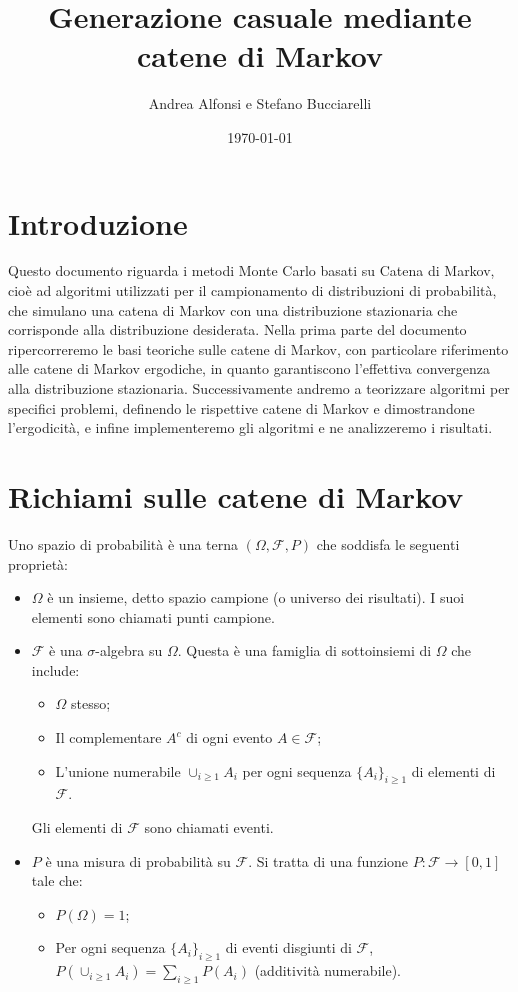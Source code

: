 \documentclass{article}
\title{Generazione casuale mediante catene di Markov}
\author{Andrea Alfonsi e Stefano Bucciarelli}
\date{\today}
\begin{document}
\maketitle
\newpage

\tableofcontents
\newpage

\section{Introduzione}

Questo documento riguarda i metodi Monte Carlo basati su Catena di Markov, cioè ad algoritmi utilizzati per il campionamento di distribuzioni di probabilità, che simulano una catena di Markov con una distribuzione stazionaria che corrisponde alla distribuzione desiderata. Nella prima parte del documento ripercorreremo le basi teoriche sulle catene di Markov, con particolare riferimento alle catene di Markov ergodiche, in quanto garantiscono l'effettiva convergenza alla distribuzione stazionaria. Successivamente andremo a teorizzare algoritmi per specifici problemi, definendo le rispettive catene di Markov e dimostrandone l'ergodicità, e infine implementeremo gli algoritmi e ne analizzeremo i risultati. 

\section{Richiami sulle catene di Markov}
Uno spazio di probabilit\`a \`e una terna $(\Omega, \mathcal{F}, P)$ che soddisfa le seguenti propriet\`a: 

\begin{itemize}
    \item \textbf{$\Omega$} \`e un insieme, detto spazio campione (o universo dei risultati). I suoi elementi sono chiamati punti campione.
    \item \textbf{$\mathcal{F}$} \`e una $\sigma$-algebra su $\Omega$. Questa \`e una famiglia di sottoinsiemi di $\Omega$ che include:
    \begin{itemize}
        \item $\Omega$ stesso;
        \item Il complementare $A^c$ di ogni evento $A \in \mathcal{F}$;
        \item L'unione numerabile $\cup_{i \ge 1}A_i$ per ogni sequenza $\{A_i\}_{i \ge 1}$ di elementi di $\mathcal{F}$.
    \end{itemize}
    Gli elementi di $\mathcal{F}$ sono chiamati eventi.
    \item \textbf{$P$} \`e una misura di probabilità su $\mathcal{F}$. Si tratta di una funzione $P: \mathcal{F} \rightarrow [0,1]$ tale che:
    \begin{itemize}
        \item $P(\Omega) = 1$;
        \item Per ogni sequenza $\{A_i\}_{i \ge 1}$ di eventi disgiunti di $\mathcal{F}$, $P(\cup_{i \ge 1}A_i) = \sum_{i \ge 1} P(A_i)$ (additivit\`a numerabile).
    \end{itemize}
\end{itemize}
\end{document}
